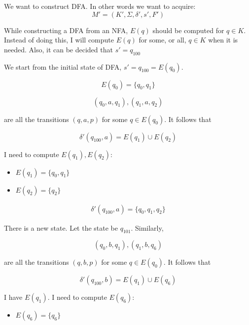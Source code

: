 We want to construct DFA. In other words we want to acquire:
\begin{equation*}
    M' = (K', \Sigma, \delta', s', F')
\end{equation*}

While constructing a DFA from an NFA, $E(q)$ should be computed for $q \in K$. Instead of doing this, I will compute $E(q)$ for some, or all, $q \in K$ when it is needed. Also, it can be decided that $s' = q_{100}$

We start from the initial state of DFA, $s' = q_{100} = E(q_0)$.

\begin{equation*}
    E(q_{0}) = \{ q_{0}, q_{1} \}
\end{equation*}

\begin{equation*}
    (q_{0}, a, q_{1}), (q_{1}, a, q_{2})
\end{equation*}

\noindent are all the transitions $(q, a, p)$ for some $q \in E(q_{0})$. It follows that

\begin{equation*}
    \delta'(q_{100}, a) = E(q_{1}) \cup E(q_{2})
\end{equation*}

\noindent I need to compute $E(q_{1}), E(q_{2})$:
\begin{itemize}
    \item $E(q_{1}) = \{ q_{0}, q_{1} \}$
    \item $E(q_{2}) = \{ q_{2} \}$
\end{itemize}

\begin{align*}
    \delta'(q_{100}, a) = \{ q_{0}, q_{1}, q_{2} \}
\end{align*}

\noindent There is a new state. Let the state be $q_{101}$. Similarly,

\begin{equation*}
    (q_{0}, b, q_{1}), (q_{1}, b, q_{6})
\end{equation*}

\noindent are all the transitions $(q, b, p)$ for some $q \in E(q_{0})$. It follows that

\begin{equation*}
    \delta'(q_{100}, b) = E(q_{1}) \cup E(q_{6})
\end{equation*}

\noindent I have $E(q_{1})$. I need to compute $E(q_{6})$:
\begin{itemize}
    \item $E(q_{6}) = \{ q_{6} \}$
\end{itemize}

